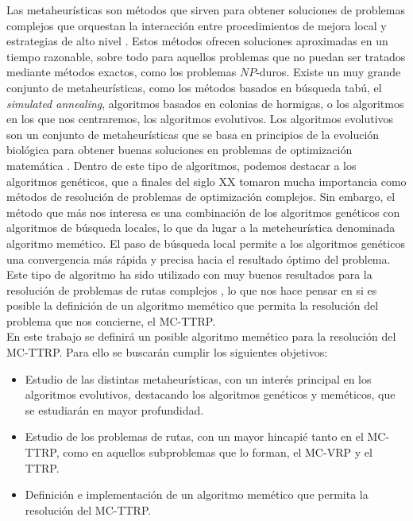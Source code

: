 \documentclass[11pt,a4paper]{book}
\theoremstyle{definition}
\theoremstyle{remark}
\begin{document}
Las metaheurísticas son métodos que sirven para obtener soluciones de problemas complejos que orquestan la interacción entre procedimientos de mejora local y estrategias de alto nivel \cite{metah-hb}. Estos métodos ofrecen soluciones aproximadas en un tiempo razonable, sobre todo para aquellos problemas que no puedan ser tratados mediante métodos exactos, como los problemas $NP$-duros. Existe un muy grande conjunto de metaheurísticas, como los métodos basados en búsqueda tabú, el \textit{simulated annealing}, algoritmos basados en colonias de hormigas, o los algoritmos en los que nos centraremos, los algoritmos evolutivos. Los algoritmos evolutivos son un conjunto de metaheurísticas que se basa en principios de la evolución biológica para obtener buenas soluciones en problemas de optimización matemática \cite{evolutionary}. Dentro de este tipo de algoritmos, podemos destacar a los algoritmos genéticos, que a finales del siglo XX tomaron mucha importancia como métodos de resolución de problemas de optimización complejos. Sin embargo, el método que más nos interesa es una combinación de los algoritmos genéticos con algoritmos de búsqueda locales, lo que da lugar a la meteheurística denominada algoritmo memético. El paso de búsqueda local permite a los algoritmos genéticos una convergencia más rápida y precisa hacia el resultado óptimo del problema. Este tipo de algoritmo ha sido utilizado con muy buenos resultados para la resolución de problemas de rutas complejos \cite{MC-VRP-Memetic-ElFallahi,MC-VRP-Stochastic-Mendoza,ttrp-memetic}, lo que nos hace pensar en si es posible la definición de un algoritmo memético que permita la resolución del problema que nos concierne, el MC-TTRP.\\

En este trabajo se definirá un posible algoritmo memético para la resolución del MC-TTRP. Para ello se buscarán cumplir los siguientes objetivos:
\begin{itemize}
    \item Estudio de las distintas metaheurísticas, con un interés principal en los algoritmos evolutivos, destacando los algoritmos genéticos y meméticos, que se estudiarán en mayor profundidad.
    \item Estudio de los problemas de rutas, con un mayor hincapié tanto en el MC-TTRP, como en aquellos subproblemas que lo forman, el MC-VRP y el TTRP.
    \item Definición e implementación de un algoritmo memético que permita la resolución del MC-TTRP.
\end{itemize}
\end{document}
